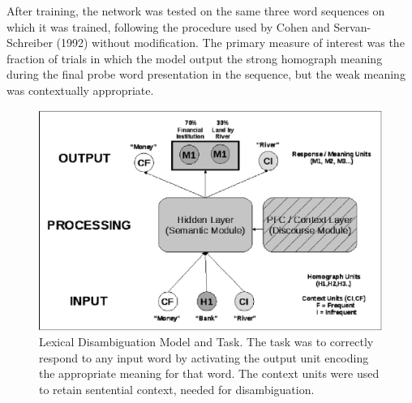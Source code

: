 
After training, the network was tested on the same three word sequences on which it was trained, following the procedure used by Cohen and Servan-Schreiber (1992) without modification. The primary measure of interest was the fraction of trials in which the model output the strong homograph meaning during the final probe word presentation in the sequence, but the weak meaning was contextually appropriate.

\begin{figure}[tp]
\begin{center}
	\includegraphics[width=115mm]{figures/lexAmb_network_cartoon.eps}
\end{center}
\caption{Lexical Disambiguation Model and Task.  The task was to correctly respond to any input word by activating the output unit encoding the appropriate meaning for that word. The context units were used to retain sentential context, needed for disambiguation.}
\label{lexamb-model-task}
\end{figure} 

